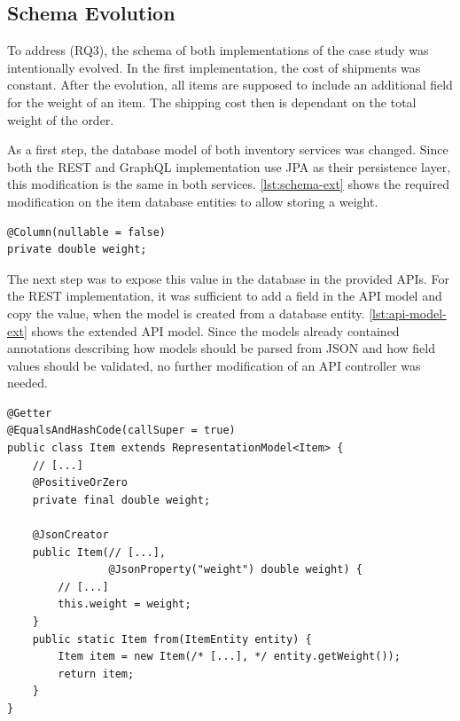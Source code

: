 \subsection{Schema Evolution}\label{sec:cs-schema-ev}

To address (\acs{RQ}3), the schema of both implementations of the case study was intentionally evolved.
In the first implementation, the cost of shipments was constant.
After the evolution, all items are supposed to include an additional field for the weight of an item.
The shipping cost then is dependant on the total weight of the order.

As a first step, the database model of both inventory services was changed.
Since both the \ac{REST} and GraphQL implementation use \ac{JPA} as their persistence layer, this modification is the same in both services.
\autoref{lst:schema-ext} shows the required modification on the item database entities to allow storing a weight.

\begin{lstlisting}[style=java-ext, caption=Extended Database Schema of Items, label=lst:schema-ext]
@Column(nullable = false)
private double weight;
\end{lstlisting}

The next step was to expose this value in the database in the provided \acp{API}.
For the \ac{REST} implementation, it was sufficient to add a field in the \ac{API} model and copy the value, when the model is created from a database entity.
\autoref{lst:api-model-ext} shows the extended \ac{API} model.
Since the models already contained annotations describing how models should be parsed from \ac{JSON} and how field values should be validated, no further modification of an \ac{API} controller was needed.

\begin{minipage}{\linewidth}
\begin{lstlisting}[style=java-ext, caption=Extended \acs{API} Model for Items in the \ac{REST} Inventory Microservice, label=lst:api-model-ext]
@Getter
@EqualsAndHashCode(callSuper = true)
public class Item extends RepresentationModel<Item> {
    // [...]
    @PositiveOrZero
    private final double weight;
    
    @JsonCreator
    public Item(// [...],
                @JsonProperty("weight") double weight) {
        // [...]
        this.weight = weight;
    }
    public static Item from(ItemEntity entity) {
        Item item = new Item(/* [...], */ entity.getWeight());
        return item;
    }
}
\end{lstlisting}
\end{minipage}

